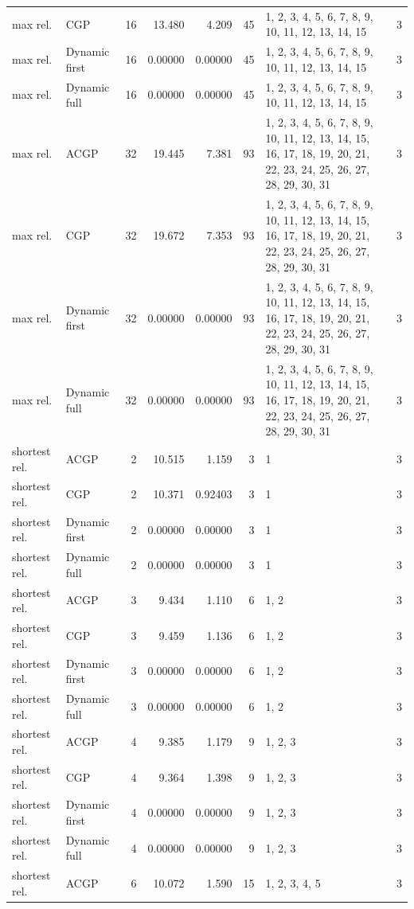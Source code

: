 \documentclass[10pt,a4paper]{article}
\begin{document}
\begin{longtable}{@{}p{23mm}p{29mm}rrrrp{36mm}r@{}}
max rel. & CGP & 16 & 13.480 & 4.209 & 45 & 1, 2, 3, 4, 5, 6, 7, 8, 9, 10, 11, 12, 13, 14, 15 & 3 \\
max rel. & Dynamic first & 16 & 0.00000 & 0.00000 & 45 & 1, 2, 3, 4, 5, 6, 7, 8, 9, 10, 11, 12, 13, 14, 15 & 3 \\
max rel. & Dynamic full & 16 & 0.00000 & 0.00000 & 45 & 1, 2, 3, 4, 5, 6, 7, 8, 9, 10, 11, 12, 13, 14, 15 & 3 \\
max rel. & ACGP & 32 & 19.445 & 7.381 & 93 & 1, 2, 3, 4, 5, 6, 7, 8, 9, 10, 11, 12, 13, 14, 15, 16, 17, 18, 19, 20, 21, 22, 23, 24, 25, 26, 27, 28, 29, 30, 31 & 3 \\
max rel. & CGP & 32 & 19.672 & 7.353 & 93 & 1, 2, 3, 4, 5, 6, 7, 8, 9, 10, 11, 12, 13, 14, 15, 16, 17, 18, 19, 20, 21, 22, 23, 24, 25, 26, 27, 28, 29, 30, 31 & 3 \\
max rel. & Dynamic first & 32 & 0.00000 & 0.00000 & 93 & 1, 2, 3, 4, 5, 6, 7, 8, 9, 10, 11, 12, 13, 14, 15, 16, 17, 18, 19, 20, 21, 22, 23, 24, 25, 26, 27, 28, 29, 30, 31 & 3 \\
max rel. & Dynamic full & 32 & 0.00000 & 0.00000 & 93 & 1, 2, 3, 4, 5, 6, 7, 8, 9, 10, 11, 12, 13, 14, 15, 16, 17, 18, 19, 20, 21, 22, 23, 24, 25, 26, 27, 28, 29, 30, 31 & 3 \\
shortest rel. & ACGP & 2 & 10.515 & 1.159 & 3 & 1 & 3 \\
shortest rel. & CGP & 2 & 10.371 & 0.92403 & 3 & 1 & 3 \\
shortest rel. & Dynamic first & 2 & 0.00000 & 0.00000 & 3 & 1 & 3 \\
shortest rel. & Dynamic full & 2 & 0.00000 & 0.00000 & 3 & 1 & 3 \\
shortest rel. & ACGP & 3 & 9.434 & 1.110 & 6 & 1, 2 & 3 \\
shortest rel. & CGP & 3 & 9.459 & 1.136 & 6 & 1, 2 & 3 \\
shortest rel. & Dynamic first & 3 & 0.00000 & 0.00000 & 6 & 1, 2 & 3 \\
shortest rel. & Dynamic full & 3 & 0.00000 & 0.00000 & 6 & 1, 2 & 3 \\
shortest rel. & ACGP & 4 & 9.385 & 1.179 & 9 & 1, 2, 3 & 3 \\
shortest rel. & CGP & 4 & 9.364 & 1.398 & 9 & 1, 2, 3 & 3 \\
shortest rel. & Dynamic first & 4 & 0.00000 & 0.00000 & 9 & 1, 2, 3 & 3 \\
shortest rel. & Dynamic full & 4 & 0.00000 & 0.00000 & 9 & 1, 2, 3 & 3 \\
shortest rel. & ACGP & 6 & 10.072 & 1.590 & 15 & 1, 2, 3, 4, 5 & 3 \\

\end{longtable}
\end{document}
